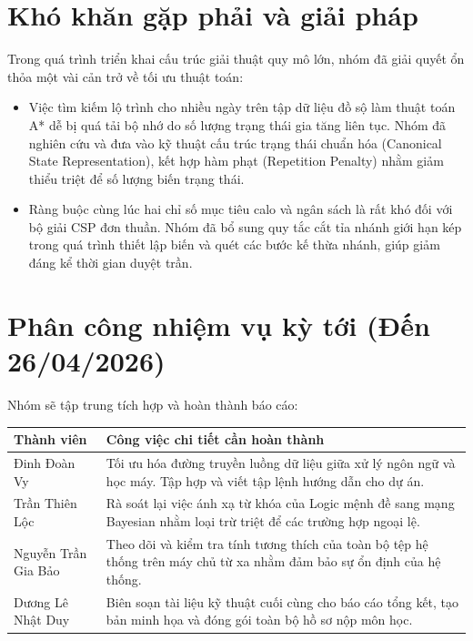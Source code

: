 \documentclass[a4paper, 12pt]{article}
\begin{document}
\section{Khó khăn gặp phải và giải pháp}
Trong quá trình triển khai cấu trúc giải thuật quy mô lớn, nhóm đã giải quyết ổn thỏa một vài cản trở về tối ưu thuật toán:
\begin{itemize}
    \item Việc tìm kiếm lộ trình cho nhiều ngày trên tập dữ liệu đồ sộ làm thuật toán A* dễ bị quá tải bộ nhớ do số lượng trạng thái gia tăng liên tục. Nhóm đã nghiên cứu và đưa vào kỹ thuật cấu trúc trạng thái chuẩn hóa (Canonical State Representation), kết hợp hàm phạt (Repetition Penalty) nhằm giảm thiểu triệt để số lượng biến trạng thái.
    \item Ràng buộc cùng lúc hai chỉ số mục tiêu calo và ngân sách là rất khó đối với bộ giải CSP đơn thuần. Nhóm đã bổ sung quy tắc cắt tỉa nhánh giới hạn kép trong quá trình thiết lập biến và quét các bước kế thừa nhánh, giúp giảm đáng kể thời gian duyệt trần.
\end{itemize}

\section{Phân công nhiệm vụ kỳ tới (Đến 26/04/2026)}
Nhóm sẽ tập trung tích hợp và hoàn thành báo cáo:
\begin{table}[h!]
    \centering
    \renewcommand{\arraystretch}{1.3}
    \begin{tabularx}{\textwidth}{|p{4.5cm}|X|}
        \hline
        \textbf{Thành viên} & \textbf{Công việc chi tiết cần hoàn thành} \\
        \hline
        Đinh Đoàn Vy  & Tối ưu hóa đường truyền luồng dữ liệu giữa xử lý ngôn ngữ và học máy. Tập hợp và viết tập lệnh hướng dẫn cho dự án. \\
        \hline
        Trần Thiên Lộc & Rà soát lại việc ánh xạ từ khóa của Logic mệnh đề sang mạng Bayesian nhằm loại trừ triệt để các trường hợp ngoại lệ. \\
        \hline
        Nguyễn Trần Gia Bảo & Theo dõi và kiểm tra tính tương thích của toàn bộ tệp hệ thống trên máy chủ từ xa nhằm đảm bảo sự ổn định của hệ thống. \\
        \hline
        Dương Lê Nhật Duy  & Biên soạn tài liệu kỹ thuật cuối cùng cho báo cáo tổng kết, tạo bản minh họa và đóng gói toàn bộ hồ sơ nộp môn học. \\
        \hline
    \end{tabularx}
\end{table}
\end{document}
